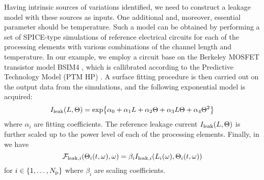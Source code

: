 Having intrinsic sources of variations identified, we need to construct a leakage model with these sources as inputs. One additional and, moreover, essential parameter should be temperature. Such a model can be obtained by performing a set of SPICE-type simulations of reference electrical circuits for each of the processing elements with various combinations of the channel length and temperature. In our example, we employ a circuit base on the Berkeley MOSFET transistor model BSIM4 \cite{bsim4}, which is callibrated according to the Predictive Technology Model (PTM HP) \cite{ptm}. A surface fitting procedure is then carried out on the output data from the simulations, and the following exponential model is acquired:
\begin{equation} \elabel{leakage-current}
  I_\leak(\Leff, \T) = \text{exp} \big\{ \alpha_0 + \alpha_1 \Leff + \alpha_2 \T + \alpha_3 \Leff \T + \alpha_4 \T^2 \big\}
\end{equation}
where $\alpha_i$ are fitting coefficients. The reference leakage current $I_{\text{leak}}(L, \Theta)$ is further scaled up to the power level of each of the processing elements. Finally, in  we have
\[
  \mathcal{F}_{\text{leak}, i}(\Theta_i(t, \omega), \omega) = \beta_i I_{\text{leak}, i}(L_i(\omega), \Theta_i(t, \omega))
\]
for $i \in \{ 1, \dotsc, {N_\text{p}} \}$ where $\beta_i$ are scaling coefficients.
